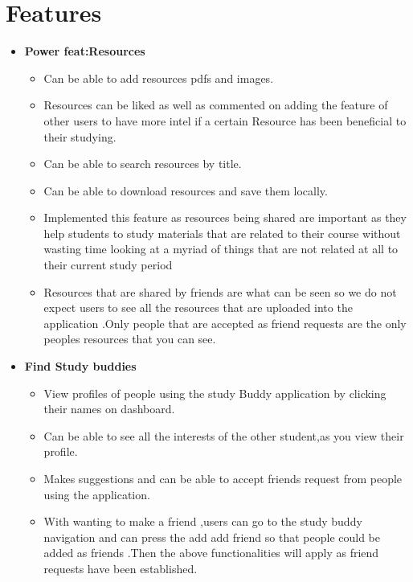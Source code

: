 \chapter{Features}

\begin{itemize}

    \item \textbf{Power feat:Resources} 
    \begin{itemize}
        \item Can be able to add resources pdfs and images.
        \item Resources can be liked as well as commented on adding the feature of other users to have more intel if a certain Resource has been beneficial to their studying.
        \item Can be able to search resources by title.
        \item Can be able to download resources and save them locally.
        \item Implemented this feature as resources being shared are important as they help students to study materials that are related to their course without wasting time looking at a myriad of things that are not related at all to their current study period
        \item Resources that are shared by friends are what can be seen so we do not expect users to see all the resources that are uploaded into the application .Only people that are accepted as friend requests are the only peoples resources that you can see.
    \end{itemize}
    
    \item \textbf{Find Study buddies} 
    \begin{itemize}
        \item View profiles of people using the study Buddy application by clicking their names on dashboard.
        \item Can be able to see all the interests of the other student,as you view their profile.
        \item Makes suggestions and can be able to accept friends request from people using the application.
        \item With wanting to make a friend ,users can go to the study buddy navigation and can press the add add friend so that people could be added as friends .Then the above functionalities will  apply as friend requests have been established.
    \end{itemize}


\end{itemize}
